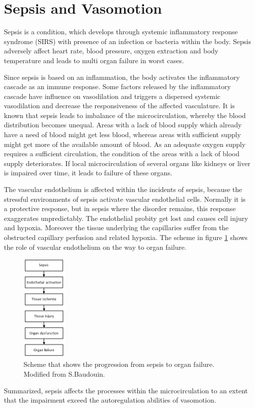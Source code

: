 
\label{chap:sepsis}
\section{Sepsis and Vasomotion}

Sepsis is a condition, which develops through systemic inflammatory response syndrome (SIRS) with presence of an infection or bacteria within the body. Sepsis adversely affect heart rate, blood pressure, oxygen extraction and body temperature and leads to multi organ failure in worst cases.\cite{pluta2010,kanta2014}

Since sepsis is based on an inflammation, the body activates the inflammatory cascade as an immune response. Some factors released by the inflammatory cascade have influence on vasodilation and triggers a dispersed systemic vasodilation and decrease the responsiveness of the affected vasculature. It is known that sepsis leads to imbalance of the microcirculation, whereby the blood distribution becomes unequal. Areas with a lack of blood supply which already have a need of blood might get less blood, whereas areas with sufficient supply might get more of the available amount of blood. As an adequate oxygen supply requires a sufficient circulation, the condition of the areas with a lack of blood supply deteriorates.
If local microcirculation of several organs like kidneys or liver is impaired over time, it leads to failure of these organs.\cite{kanta2014,baudouin2008}

The vascular endothelium is affected within the incidents of sepsis, because the stressful environments of sepsis activate vascular endothelial cells. Normally it is a protective response, but in sepsis where the disorder remains, this response exaggerates unpredictably. The endothelial probity get lost and causes cell injury and hypoxia. Moreover the tissue underlying the capillaries suffer from the obstructed capillary perfusion and related hypoxia. The scheme in figure \ref{fig:Sepsis} shows the role of vascular endothelium on the way to organ failure.\cite{baudouin2008}

\begin{figure}[H]
	\centering	\includegraphics[width=0.2\textwidth]{figures/SepsisEndo}
	\caption{Scheme that shows the progression from sepsis to organ failure. Modified from S.Baudouin.\cite{baudouin2008}}
	\label{fig:Sepsis}
\end{figure}

Summarized, sepsis affects the processes within the microcirculation to an extent that the impairment exceed the autoregulation abilities of vasomotion.